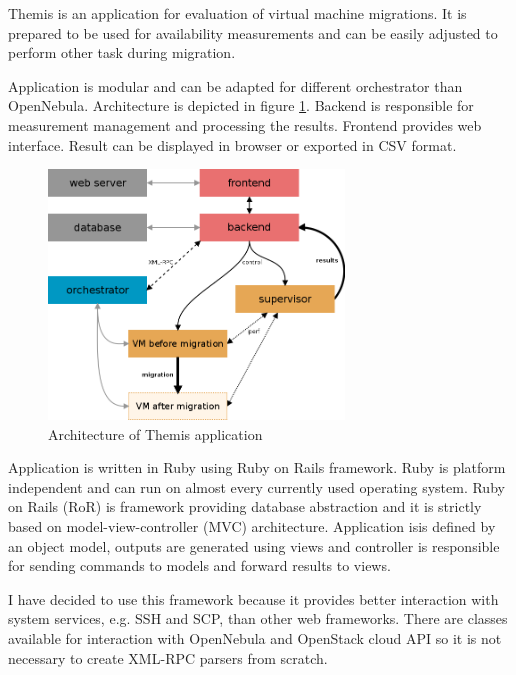 
Themis is an application for evaluation of virtual machine migrations. It is prepared to be used for availability measurements and can be easily adjusted to perform other task during migration. 

Application is modular and can be adapted for different orchestrator than OpenNebula. Architecture is depicted in figure \ref{img:themis-model}. Backend is responsible for measurement management and processing the results. Frontend provides web interface. Result can be displayed in browser or exported in \Ac{CSV} format.

\begin{figure}[htb]
	\begin{center}
	\includegraphics[width=0.7\textwidth]{themis-model.png}
	\end{center}
	\caption{Architecture of Themis application}
	\label{img:themis-model}
\end{figure}

Application is written in Ruby using Ruby on Rails framework. Ruby is platform independent and can run on almost every currently used operating system. Ruby on Rails (\Ac{RoR}) is framework providing database abstraction and it is strictly based on model-view-controller (\Ac{MVC}) architecture. Application isis  defined by an object model, outputs are generated using views and controller is responsible for sending commands to models and forward results to views.

I have decided to use this framework because it provides better interaction with system services, e.g. \Ac{SSH} and \Ac{SCP}, than other web frameworks. There are classes available for interaction with OpenNebula and OpenStack cloud \Ac{API} so it is not necessary to create \mbox{\Ac{XML}-\Ac{RPC}} parsers from scratch.

